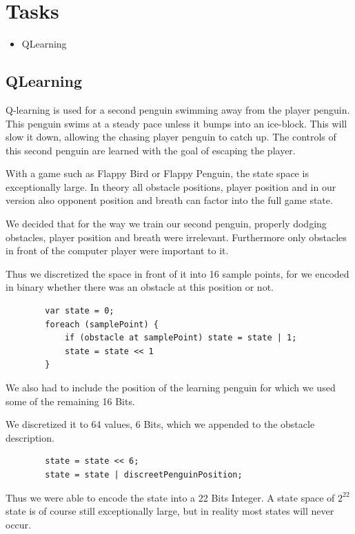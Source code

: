 \documentclass{article}
\begin{document}
    \section{Tasks}
    \begin{itemize}
        \item QLearning
    \end{itemize}

    \subsection{QLearning}
        Q-learning is used for a second penguin swimming away from the player penguin. This penguin swims at a steady pace unless it bumps into an ice-block. This will slow it down, allowing the chasing player penguin to catch up. The controls of this second penguin are learned with the goal of escaping the player.

        With a game such as Flappy Bird or Flappy Penguin, the state space is exceptionally large. In theory all obstacle positions, player position and in our version also opponent position and breath can factor into the full game state.

        We decided that for the way we train our second penguin, properly dodging obstacles, player position and breath were irrelevant. Furthermore only obstacles in front of the computer player were important to it.

        Thus we discretized the space in front of it into 16 sample points, for we encoded in binary whether there was an obstacle at this position or not.

        \begin{lstlisting}
        var state = 0;
        foreach (samplePoint) {
            if (obstacle at samplePoint) state = state | 1;
            state = state << 1
        }
        \end{lstlisting}

        We also had to include the position of the learning penguin for which we used some of the remaining 16 Bits.

        We discretized it to 64 values, 6 Bits, which we appended to the obstacle description.

        \begin{lstlisting}
        state = state << 6;
        state = state | discreetPenguinPosition;
        \end{lstlisting}

        Thus we were able to encode the state into a 22 Bits Integer. A state space of $2^22$ state is of course still exceptionally large, but in reality most states will never occur.
\end{document}
